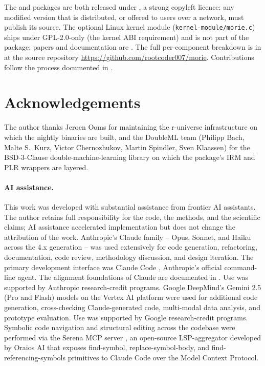 \documentclass[article,shortnames,nojss]{jss}
\begin{document}
The  and  packages are both released
under , a strong copyleft licence: any
modified version that is distributed, or offered to users over a
network, must publish its source.  The optional Linux kernel module
(\texttt{kernel-module/morie.c}) ships under GPL-2.0-only (the
kernel ABI requirement) and is not part of the package; papers and
documentation are .  The full per-component breakdown is in
 at the source repository
\url{https://github.com/rootcoder007/morie}.  Contributions follow
the process documented in .

\section*{Acknowledgements}

The author thanks Jeroen Ooms for maintaining the r-universe
infrastructure on which the  nightly binaries are
built, and the DoubleML team (Philipp Bach, Malte S.\ Kurz,
Victor Chernozhukov, Martin Spindler, Sven Klaassen) for the
BSD-3-Clause double-machine-learning library on which the
package's IRM and PLR wrappers are layered.

\paragraph*{AI assistance.}
This work was developed with substantial assistance from frontier
AI assistants.  The author retains full responsibility for the
code, the methods, and the scientific claims; AI assistance
accelerated implementation but does not change the attribution of
the work.  Anthropic's Claude family -- Opus, Sonnet, and Haiku
across the 4.x generation \citep{Anthropic2024ClaudeFamily} -- was
used extensively for code generation, refactoring, documentation,
code review, methodology discussion, and design iteration.  The
primary development interface was Claude Code
\citep{Anthropic2024ClaudeCode}, Anthropic's official
command-line agent.  The alignment foundations of Claude are
documented in \citet{Bai2022ConstitutionalAI}.  Use was supported
by Anthropic research-credit programs.  Google DeepMind's
Gemini 2.5 (Pro and Flash) models
\citep{GoogleDeepMind2024Gemini} on the Vertex AI platform
\citep{GoogleCloud2024VertexAI} were used for additional code
generation, cross-checking Claude-generated code, multi-modal
data analysis, and prototype evaluation.  Use was supported by
Google research-credit programs.  Symbolic code
navigation and structural editing across the codebase were
performed via the Serena MCP server \citep{Oraios2024Serena},
an open-source LSP-aggregator developed by Oraios AI that exposes
find-symbol, replace-symbol-body, and find-referencing-symbols
primitives to Claude Code over the Model Context Protocol.

\end{document}
